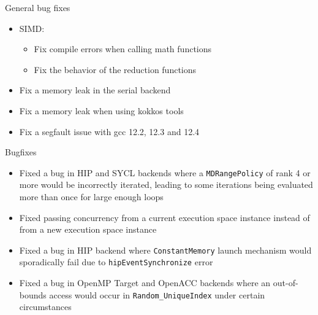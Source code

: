 \begin{frame}[fragile]{General bug fixes}
  \begin{itemize}
    \item SIMD:
    \begin{itemize}
      \item Fix compile errors when calling math functions
      \item Fix the behavior of the reduction functions
    \end{itemize}
    \item Fix a memory leak in the serial backend
    \item Fix a memory leak when using kokkos tools
    \item Fix a segfault issue with gcc 12.2, 12.3 and 12.4
  \end{itemize}
\end{frame}

\begin{frame}[fragile]{Bugfixes}
    \begin{itemize}
        \item Fixed a bug in HIP and SYCL backends where a \texttt{MDRangePolicy} of rank 4 or more would be incorrectly iterated, leading to some iterations being evaluated more than once for large enough loops
        \item Fixed passing concurrency from a current execution space instance instead of from a new execution space instance
        \item Fixed a bug in HIP backend where \texttt{ConstantMemory} launch mechanism would sporadically fail due to \texttt{hipEventSynchronize} error
        \item Fixed a bug in OpenMP Target and OpenACC backends where an out-of-bounds access would occur in \texttt{Random\_UniqueIndex} under certain circumstances
    \end{itemize}
\end{frame}

